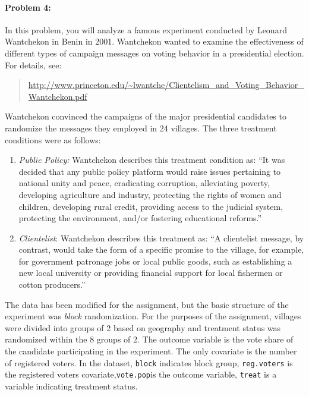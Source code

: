 \documentclass{article}
\begin{document}
\paragraph{Problem 4:}
In this problem, you will analyze a famous experiment conducted by Leonard Wantchekon in Benin in 2001. Wantchekon wanted to examine the effectiveness of different types of campaign messages on voting behavior in a presidential election.
For details, see:
\begin{quote}
  \url{http://www.princeton.edu/~lwantche/Clientelism_and_Voting_Behavior_Wantchekon.pdf}
\end{quote}

Wantchekon convinced the campaigns of the major presidential
candidates to randomize the messages they employed in 24 villages. The
three treatment conditions were as follows:
\begin{enumerate}
\item \textit{Public Policy:} Wantchekon describes this treatment condition as: ``It was decided that any public policy platform would raise issues pertaining to national unity and peace, eradicating corruption, alleviating poverty, developing agriculture and industry, protecting the rights of women and children, developing rural credit, providing access to the judicial system, protecting the environment, and/or fostering educational reforms.''
\item \textit{Clientelist}: Wantchekon describes this treatment as: ``A clientelist message, by contrast, would take the form of a specific promise to the village, for example, for government patronage jobs or local public goods, such as establishing a new local university or providing financial support for local fishermen or cotton producers.''
\end{enumerate}

The data has been modified for the assignment, but the basic structure
of the experiment was \textit{block} randomization. For the purposes
of the assignment, villages were divided into groups of 2 based on
geography and treatment status was randomized within the 8 groups of
2. The outcome variable is the vote share of the candidate
participating in the experiment. The only covariate is the number of
registered voters. In the dataset, \texttt{block} indicates block
group, \texttt{reg.voters} is the registered voters
covariate,\texttt{vote.pop}is the outcome variable, \texttt{treat} is
a variable indicating treatment status.\\
\end{document}
